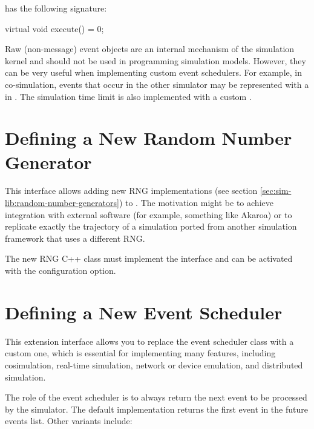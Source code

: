  has the following signature:

\begin{cpp}
virtual void execute() = 0;
\end{cpp}

Raw (non-message) event objects are an internal mechanism of the {\opp}
simulation kernel and should not be used in programming simulation models.
However, they can be very useful when implementing custom event schedulers.
For example, in co-simulation, events that occur in the other simulator may
be represented with a  in {\opp}. The simulation time limit
is also implemented with a custom .


\section{Defining a New Random Number Generator}
\label{sec:plugin-exts:rng}

This interface allows adding new RNG implementations (see section
\ref{sec:sim-lib:random-number-generators}) to {\opp}. The motivation might be
to achieve integration with external software (for example, something like
Akaroa) or to replicate exactly the trajectory of a simulation ported from
another simulation framework that uses a different RNG.

The new RNG C++ class must implement the  interface and can be
activated with the  configuration option.


\section{Defining a New Event Scheduler}
\label{sec:plugin-exts:scheduler}

This extension interface allows you to replace the event scheduler class with a
custom one, which is essential for implementing many features, including
cosimulation, real-time simulation, network or device emulation, and distributed
simulation.

The role of the event scheduler is to always return the next event to be
processed by the simulator. The default implementation returns the first event
in the future events list. Other variants include:

